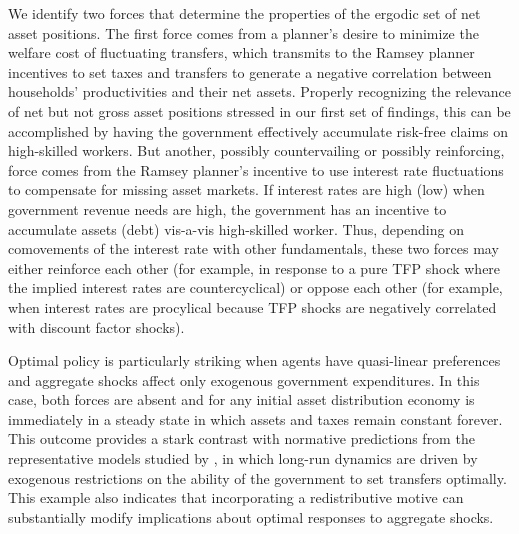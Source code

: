 \documentclass[thmsb,11pt]{article}
\begin{document}
We identify two forces that determine the properties of the ergodic set of net asset positions. The first force comes from a planner's desire to minimize the welfare cost of fluctuating transfers, which transmits to the Ramsey planner incentives to set taxes and transfers to generate a negative correlation between households' productivities and their
net assets. Properly recognizing the relevance  of net but not gross asset positions stressed in
our first set of findings, this  can be accomplished by having the  government  effectively accumulate risk-free claims on high-skilled workers.
But another, possibly countervailing or possibly reinforcing,  force  comes from the Ramsey planner's incentive to  use  interest rate fluctuations  to compensate for missing asset markets. If interest rates are high (low) when government revenue needs are high, the government has an incentive to accumulate assets (debt) vis-a-vis high-skilled worker. Thus, depending on  comovements of the interest rate with other fundamentals, these two forces  may either reinforce each other (for example, in response to  a pure TFP shock where the implied interest rates are countercyclical) or oppose each other (for example, when  interest rates are procylical because TFP shocks are negatively correlated with discount factor shocks).

Optimal policy is particularly striking when agents have quasi-linear preferences and aggregate shocks affect only exogenous government expenditures. In this case, both  forces are absent and for any initial asset distribution economy is immediately in a steady state in which assets and taxes remain constant forever. This outcome provides a stark contrast with normative predictions from the representative models studied by \citet{Aiyagari2002}, in which  long-run dynamics are driven by exogenous restrictions on the ability of the government to set transfers optimally. This example also indicates that incorporating a redistributive motive can  substantially modify implications about  optimal responses to  aggregate shocks.
\end{document}
